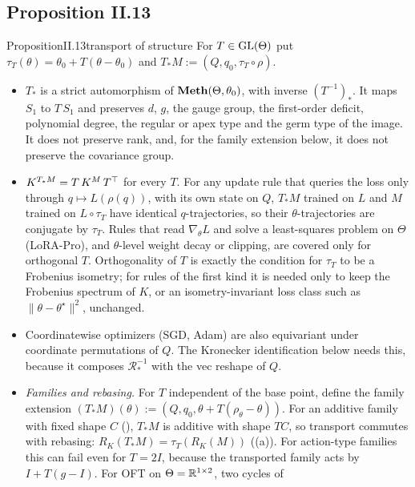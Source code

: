 \subsection{Proposition II.13}\label{proof:II.13}

\begin{restate}{Proposition}{II.13}{transport of structure}
For $T\in\mathrm{GL}(\Theta)$ put $\tau_T(\theta)=\theta_0+T(\theta-\theta_0)$ and $T_*M:=(Q,q_0,\tau_T\circ\rho)$.
\begin{itemize}
  \item $T_*$ is a strict automorphism of $\mathbf{Meth}(\Theta,\theta_0)$, with inverse $(T^{-1})_*$. It maps $S_1$ to $T\,S_1$
    and preserves $d$, $g$, the gauge group, the first-order deficit, polynomial degree, the regular or apex type and
    the germ type of the image. It does not preserve rank, and, for the family extension below, it does not preserve the
    covariance group.
  \item $K^{T_*M}=T\,K^M\,T^{\top}$ for every $T$. For any update rule that queries the loss only through
    $q\mapsto L(\rho(q))$, with its own state on $Q$, $T_*M$ trained on $L$ and $M$ trained on $L\circ\tau_T$ have
    identical $q$-trajectories, so their $\theta$-trajectories are conjugate by $\tau_T$. Rules that read
    $\nabla_\theta L$ and solve a least-squares problem on $\Theta$ (LoRA-Pro), and $\theta$-level weight decay or
    clipping, are covered only for orthogonal $T$. Orthogonality of $T$ is exactly the condition for $\tau_T$ to be a
    Frobenius isometry; for rules of the first kind it is needed only to keep the Frobenius spectrum of $K$, or an
    isometry-invariant loss class such as $\lVert\theta-\theta^\star\rVert^2$, unchanged.
  \item Coordinatewise optimizers (SGD, Adam) are also equivariant under coordinate permutations of $Q$. The Kronecker
    identification below needs this, because it composes $\mathcal R^{-1}_*$ with the vec reshape of $Q$.
  \item \emph{Families and rebasing.} For $T$ independent of the base point, define the family extension
    $(T_*M)(\theta):=(Q,q_0,\theta+T(\rho_\theta-\theta))$. For an additive family with fixed shape $C$
    (), $T_*M$ is additive with shape $TC$, so transport commutes with rebasing:
    $R_K(T_*M)=\tau_T(R_K(M))$ ((a)). For action-type families this can fail even for $T=2I$,
    because the transported family acts by $I+T(g-I)$. For OFT on $\Theta=\mathbb{R}^{1\times2}$, two cycles of

\end{itemize}
\end{restate}
